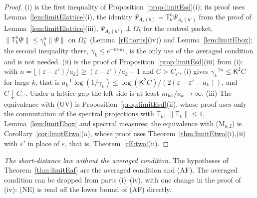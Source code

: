 \begin{proof}
(i) is the first inequality of Proposition~\ref{prop:limitEsd}(i); its
proof uses Lemma~\ref{lem:limitElattice}(i), the identity $\Psi_{A_k(h)}=
\mathbb T_k^n\Psi_{A_k(h')}$ from the proof of
Lemma~\ref{lem:limitElattice}(iii), $\Psi_{A_k(h')}\perp\Omega_k$ for the
centred packet, $\|\mathbb T_k^n\Psi\|\le\gamma_k^n\|\Psi\|$ on
$\Omega_k^\perp$ (Lemma~\ref{rE:torus}(iv)) and Lemma~\ref{lem:limitEbox};
the second inequality there, $\gamma_k\le e^{-m_*a_k}$, is the only use of
the averaged condition and is not needed. (ii) is the proof of
Proposition~\ref{prop:limitEsd}(iii) from (i): with $n=\lfloor(\varepsilon-
\varepsilon')/a_k\rfloor\ge(\varepsilon-\varepsilon')/a_k-1$ and $C>C_{
\varepsilon'}$, (i) gives $\gamma_k^{-2n}\le\mathsf K^2C$ for large $k$,
that is $a_k^{-1}\log(1/\gamma_k)\le\log(\mathsf K^2C)/(2(\varepsilon-
\varepsilon'-a_k))$, and $C\downarrow C_{\varepsilon'}$. Under a lattice gap
the left side is at least $m_{\mathrm{lat}}/a_k\to\infty$. (iii) The
equivalence with (UV) is Proposition~\ref{prop:limitEsd}(ii), whose proof
uses only the commutation of the spectral projections with $\mathbb T_k$,
$\|\mathbb T_k\|\le1$, Lemma~\ref{lem:limitEbox} and spectral measures; the
equivalence with (M$_{\mathrm s,2}$) is Corollary~\ref{cor:limitEtwo}(a),
whose proof uses Theorem~\ref{thm:limitEtwo}(i),(ii) with $\varepsilon'$ in
place of $\varepsilon$, that is, Theorem~\ref{rE:two}(ii).
\end{proof}

\emph{The short-distance law without the averaged condition.} The
hypotheses of Theorem~\ref{thm:limitEaf} are the averaged condition and
(AF). The averaged condition can be dropped from parts (i)--(iv), with one
change in the proof of (iv): (NE) is read off the lower bound of (AF)
directly.

